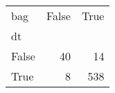 \begin{tabular}{lrr}
\toprule
bag &  False &  True  \\
dt    &        &        \\
\midrule
False &     40 &     14 \\
True  &      8 &    538 \\
\bottomrule
\end{tabular}

